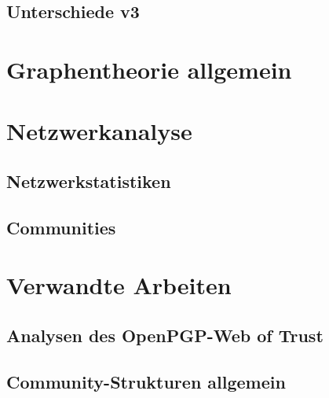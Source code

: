 \subsection{Unterschiede v3}
\label{ch:Grundlagen:sec:OpenPGP:subsec:v3Format}

\section{Graphentheorie allgemein}
\label{ch:Grundlagen:sec:Graphentheorie}

\section{Netzwerkanalyse}
\label{ch:Grundlagen:sec:Netzwerkanalyse}

\subsection{Netzwerkstatistiken}
\label{ch:Grundlagen:sec:Netzwerkanalyse:subsec:Statistiken}

\subsection{Communities}
\label{ch:Grundlagen:sec:Netzwerkanalyse:subsec:Communities}





\section{Verwandte Arbeiten}
\label{ch:Grundlagen:sec:RelatedWork}



\subsection{Analysen des OpenPGP-Web of Trust}
\label{ch:Grundlagen:sec:RelatedWork:subsec:wot-analysis}

\subsection{Community-Strukturen allgemein}
\label{ch:Grundlagen:sec:RelatedWork:subsec:community-analysis}



